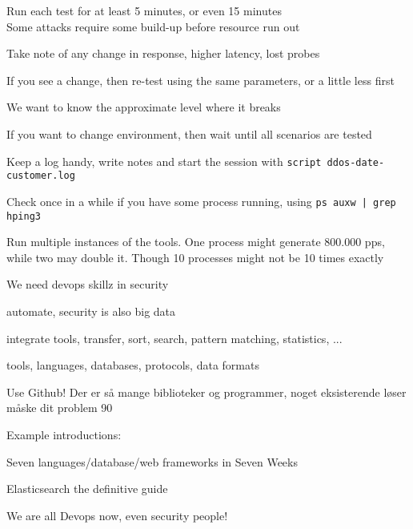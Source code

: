\documentclass[Screen16to9,17pt]{foils}
\begin{document}

\begin{list2}
\item Run each test for at least 5 minutes, or even 15 minutes\\
Some attacks require some build-up before resource run out
\item Take note of any change in response, higher latency, lost probes
\item If you see a change, then re-test using the same parameters, or a little less first
\item We want to know the approximate level where it breaks
\item If you want to change environment, then wait until all scenarios are tested
\item Keep a log handy, write notes and start the session with \verb+script ddos-date-customer.log+
\item Check once in a while if you have some process running, using \verb+ps auxw | grep hping3+
\item Run multiple instances of the tools. One process might generate 800.000 pps, while two may double it. Though 10 processes might not be 10 times exactly
\end{list2}



\begin{list1}
\item We need devops skillz in security
\item automate, security is also big data
\item integrate tools, transfer, sort, search, pattern matching, statistics, ...
\item tools, languages, databases, protocols, data formats
\item Use Github! Der er så mange biblioteker og programmer, noget eksisterende løser måske dit problem 90%
\item Example introductions:
\begin{list2}
\item Seven languages/database/web frameworks in Seven Weeks
\item Elasticsearch the definitive guide
\end{list2}
\end{list1}

\centerline{We are all Devops now, even security people!}


\myquestionspage
\end{document}
